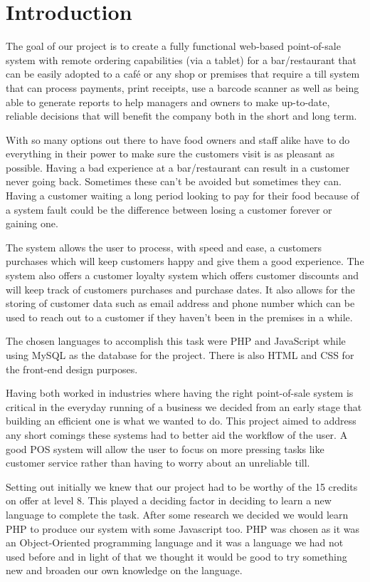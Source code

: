 \chapter{Introduction}
The goal of our project is to create a fully functional web-based point-of-sale system with remote ordering capabilities (via a tablet) for a bar/restaurant that can be easily adopted to a café or any shop or premises that require a till system that can process payments, print receipts, use a barcode scanner as well as being able to generate reports to help managers and owners to make up-to-date, reliable decisions that will benefit the company both in the short and long term.\par
With so many options out there to have food owners and staff alike have to do everything in their power to make sure the customers visit is as pleasant as possible. Having a bad experience at a bar/restaurant can result in a customer never going back. Sometimes these can’t be avoided but sometimes they can. Having a customer waiting a long period looking to pay for their food because of a system fault could be the difference between losing a customer forever or gaining one.\par
The system allows the user to process, with speed and ease, a customers purchases which will keep customers happy and give them a good experience.
The system also offers a customer loyalty system which offers customer discounts and will keep track of customers purchases and purchase dates. It also allows for the storing of customer data such as email address and phone number which can be used to reach out to a customer if they haven’t been in the premises in a while.\par
The chosen languages to accomplish this task were PHP and JavaScript while using MySQL as the database for the project. There is also HTML and CSS for the front-end design purposes.\par
Having both worked in industries where having the right point-of-sale system is critical in the everyday running of a business we decided from an early stage that building an efficient one is what we wanted to do. This project aimed to address any short comings these systems had to better aid the workflow of the user. A good POS system will allow the user to focus on more pressing tasks like customer service rather than having to worry about an unreliable till.\par
Setting out initially we knew that our project had to be worthy of the 15 credits on offer at level 8. This played a deciding factor in deciding to learn a new language to complete the task. After some research we decided we would learn PHP to produce our system with some Javascript too. PHP was chosen as it was an Object-Oriented programming language and it was a language we had not used before and in light of that we thought it would be good to try something new and broaden our own knowledge on the language.\par
